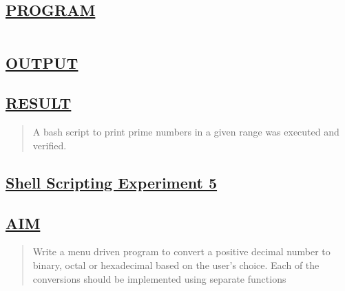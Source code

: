 \documentclass[a4paper, 12pt]{article}
\begin{document}
\subsection*{\underline{PROGRAM}}
\begin{quote}
\inputminted[fontsize=\small,breaklines,breakanywhere]{sh}{shell1.sh}%
\end{quote}


\subsection*{\underline{OUTPUT}}

\begin{figure}[H] 
    \centering
\end{figure}


\subsection*{\underline{RESULT}}
\begin{quote}
A bash script to print prime numbers in a given range was executed and verified.
\end{quote}

\newpage
\begin{center}
\section*{\LARGE \textbf{\underline{Shell Scripting Experiment 5}}} %
\end{center}

\subsection*{\underline{AIM}}
\begin{quote}
Write a menu driven program to convert a positive decimal number to binary, octal or
hexadecimal based on the user's choice. Each of the conversions should be implemented
using separate functions
\end{quote}
\end{document}
